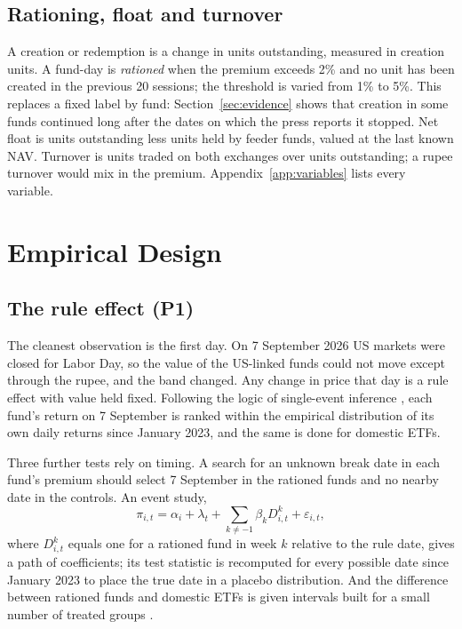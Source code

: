 \subsection{Rationing, float and turnover}
A creation or redemption is a change in units outstanding, measured in creation units. A fund-day is \emph{rationed} when the premium exceeds 2\% and no unit has been created in the previous 20 sessions; the threshold is varied from 1\% to 5\%. This replaces a fixed label by fund: Section~\ref{sec:evidence} shows that creation in some funds continued long after the dates on which the press reports it stopped. Net float is units outstanding less units held by feeder funds, valued at the last known NAV. Turnover is units traded on both exchanges over units outstanding; a rupee turnover would mix in the premium. Appendix~\ref{app:variables} lists every variable.

\section{Empirical Design}\label{sec:design}
\subsection{The rule effect (P1)}
The cleanest observation is the first day. On 7 September 2026 US markets were closed for Labor Day, so the value of the US-linked funds could not move except through the rupee, and the band changed. Any change in price that day is a rule effect with value held fixed. Following the logic of single-event inference \citep{gelbach2013valid}, each fund's return on 7 September is ranked within the empirical distribution of its own daily returns since January 2023, and the same is done for domestic ETFs.

Three further tests rely on timing. A search for an unknown break date in each fund's premium \citep{bai1998estimating} should select 7 September in the rationed funds and no nearby date in the controls. An event study,
\begin{equation}\label{eq:event}
\pi_{i,t}=\alpha_i+\lambda_t+\sum_{k\neq -1}\beta_k D^{k}_{i,t}+\varepsilon_{i,t},
\end{equation}
where $D^{k}_{i,t}$ equals one for a rationed fund in week $k$ relative to the rule date, gives a path of coefficients; its test statistic is recomputed for every possible date since January 2023 to place the true date in a placebo distribution. And the difference between rationed funds and domestic ETFs is given intervals built for a small number of treated groups \citep{conley2011inference,ferman2019inference}.

